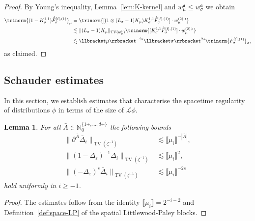 \documentclass{article}
\numberwithin{equation}{section}
\theoremstyle{plain}
\newtheorem{lemma}[theorem]{Lemma}
\theoremstyle{definition}
\begin{document}
\begin{proof}
  By Young's inequality, Lemma~\ref{lem:K-kernel} and $w_{\mu}^{\mathfrak{a}}
  \leqslant w_{\sigma}^{\mathfrak{a}}$ we obtain
  \[ \begin{aligned}
       \trinorm{ (1 - K^{1, 1}_{\sigma}) \dot{\bar{F}}_{\sigma}^{[\ell],
       (1)} }_{\mu} & =  \trinorm{ [(1 \otimes (L_{\sigma} - 1)
       K_{\mu}) K^{1, 1}_{\sigma} \dot{\bar{F}}_{\sigma}^{[\ell], (1)}] \cdot
       w_{\mu}^{(2), \flat} }\\
       & \lesssim  \| (L_{\sigma} - 1) K_{\mu} \|_{\operatorname{TV}
       (w_{\mu}^{\flat})}  \trinorm{ [K^{1, 1}_{\sigma}
       \dot{\bar{F}}_{\sigma}^{[\ell], (1)}] \cdot w_{\mu}^{(2), \flat}
       }\\
       & \lesssim  \llbracket \mu \rrbracket^{- 2 s} \llbracket \sigma
       \rrbracket^{2 s}  \trinorm{ \dot{\bar{F}}_{\sigma}^{[\ell], (1)}
       }_{\sigma},
     \end{aligned} \]
  as claimed.
\end{proof}

\subsection{Schauder estimates}

In this section, we establish estimates that characterise the spacetime
regularity of distributions $\phi$ in terms of the size of $\mathcal{L} \phi$.

\begin{lemma}
  \label{lem:LP-block}For all $\bar A \in \mathbb{N}_0^{\{1 \pm, \ldots, d \pm
  \}}$ the following bounds
  \begin{align*}
    \| \partial^{\bar A} \bar{\Delta}_i \|_{\operatorname{TV}(\zeta^{- 1})}
    &\lesssim \llbracket \mu_i \rrbracket^{- | \bar A |},\\
    \| (1 - \Delta_{\varepsilon})^{- 1}
    \bar{\Delta}_i \|_{\operatorname{TV}(\zeta^{- 1})}
    &\lesssim \llbracket \mu_i \rrbracket^2,\\
    \| (-\Delta_{\varepsilon})^s
    \bar{\Delta}_i \|_{\operatorname{TV}(\zeta^{- 1})}
    &\lesssim \llbracket \mu_i \rrbracket^{- 2 s}
  \end{align*}
  hold uniformly in $i \geqslant - 1$.
\end{lemma}

\begin{proof}
  The estimates follow from the identity $\llbracket \mu_i \rrbracket = 2^{-
  i - 2}$ and Definition~\ref{def:space-LP} of the spatial Littlewood-Paley blocks.
\end{proof}
\end{document}
